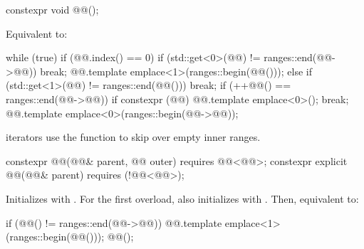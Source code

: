 %
\begin{itemdecl}
constexpr void @@();
\end{itemdecl}

\begin{itemdescr}
\pnum
\effects
Equivalent to:
\begin{codeblock}
while (true) {
  if (@@.index() == 0) {
    if (std::get<0>(@@) != ranges::end(@@->@@))
      break;
    @@.template emplace<1>(ranges::begin(@@()));
  } else {
    if (std::get<1>(@@) != ranges::end(@@()))
      break;
    if (++@@() == ranges::end(@@->@@)) {
      if constexpr (@@)
        @@.template emplace<0>();
      break;
    }
    @@.template emplace<0>(ranges::begin(@@->@@));
  }
}
\end{codeblock}

\begin{note}
 iterators use the  function
to skip over empty inner ranges.
\end{note}
\end{itemdescr}

%
\begin{itemdecl}
constexpr @@(@@& parent, @@ outer)
  requires @@<@@>;
constexpr explicit @@(@@& parent)
  requires (!@@<@@>);
\end{itemdecl}

\begin{itemdescr}
\pnum
\effects
Initializes  with .
For the first overload, also initializes
 with .
Then, equivalent to:
\begin{codeblock}
if (@@() != ranges::end(@@->@@)) {
  @@.template emplace<1>(ranges::begin(@@()));
  @@();
}
\end{codeblock}
\end{itemdescr}

